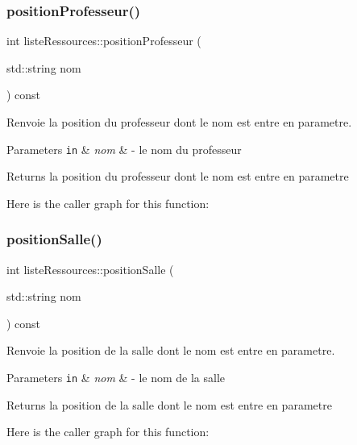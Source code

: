 \subsubsection{\texorpdfstring{position\+Professeur()}{positionProfesseur()}}
{\footnotesize\ttfamily int liste\+Ressources\+::position\+Professeur (\begin{DoxyParamCaption}\item[{std\+::string}]{nom }\end{DoxyParamCaption}) const}



Renvoie la position du professeur dont le nom est entre en parametre. 


\begin{DoxyParams}[1]{Parameters}
\mbox{\tt in}  & {\em nom} & -\/ le nom du professeur \\
\hline
\end{DoxyParams}
\begin{DoxyReturn}{Returns}
la position du professeur dont le nom est entre en parametre 
\end{DoxyReturn}
Here is the caller graph for this function\+:
\hypertarget{classliste_ressources_ad4f9c36ed425f2a3d4ca161abd6198da}{}\label{classliste_ressources_ad4f9c36ed425f2a3d4ca161abd6198da} 
\subsubsection{\texorpdfstring{position\+Salle()}{positionSalle()}}
{\footnotesize\ttfamily int liste\+Ressources\+::position\+Salle (\begin{DoxyParamCaption}\item[{std\+::string}]{nom }\end{DoxyParamCaption}) const}



Renvoie la position de la salle dont le nom est entre en parametre. 


\begin{DoxyParams}[1]{Parameters}
\mbox{\tt in}  & {\em nom} & -\/ le nom de la salle \\
\hline
\end{DoxyParams}
\begin{DoxyReturn}{Returns}
la position de la salle dont le nom est entre en parametre 
\end{DoxyReturn}
Here is the caller graph for this function\+:
\hypertarget{classliste_ressources_a9500ccbddb1b0a65fbc2819dcfba3fb4}{}\label{classliste_ressources_a9500ccbddb1b0a65fbc2819dcfba3fb4} 
